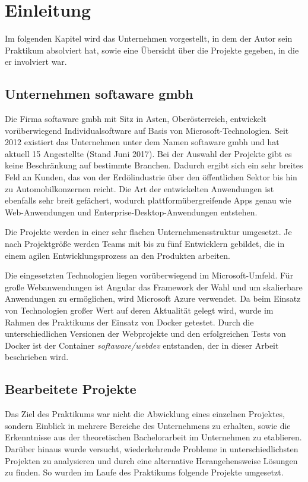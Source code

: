 \chapter{Einleitung}
\label{cha:introduction}

Im folgenden Kapitel wird das Unternehmen vorgestellt, in dem der Autor sein Praktikum absolviert hat, sowie eine Übersicht über die Projekte gegeben, in die er involviert war.

\section{Unternehmen softaware gmbh}
\label{sec:softaware}
Die Firma softaware gmbh mit Sitz in Asten, Oberösterreich, entwickelt vorüberwiegend Individualsoftware auf Basis von Microsoft-Technologien.
Seit 2012 existiert das Unternehmen unter dem Namen softaware gmbh und hat aktuell 15 Angestellte (Stand Juni 2017).
Bei der Auswahl der Projekte gibt es keine Beschränkung auf bestimmte Branchen.
Dadurch ergibt sich ein sehr breites Feld an Kunden, das von der Erdölindustrie über den öffentlichen Sektor bis hin zu Automobilkonzernen reicht.
Die Art der entwickelten Anwendungen ist ebenfalls sehr breit gefächert, wodurch plattformübergreifende Apps genau wie Web-Anwendungen und Enterprise-Desktop-Anwendungen entstehen.

Die Projekte werden in einer sehr flachen Unternehmensstruktur umgesetzt.
Je nach Projektgröße werden Teams mit bis zu fünf Entwicklern gebildet, die in einem agilen Entwicklungsprozess an den Produkten arbeiten.

Die eingesetzten Technologien liegen vorüberwiegend im Microsoft-Umfeld.
Für große Webanwendungen ist Angular das Framework der Wahl und um skalierbare Anwendungen zu ermöglichen, wird Microsoft Azure verwendet.
Da beim Einsatz von Technologien großer Wert auf deren Aktualität gelegt wird, wurde im Rahmen des Praktikums der Einsatz von Docker getestet.
Durch die unterschiedlichen Versionen der Webprojekte und den erfolgreichen Tests von Docker ist der Container \emph{softaware/webdev} entstanden, der in dieser Arbeit beschrieben wird.


\section{Bearbeitete Projekte}
\label{sec:projects}

Das Ziel des Praktikums war nicht die Abwicklung eines einzelnen Projektes, sondern Einblick in mehrere Bereiche des Unternehmens zu erhalten, sowie die Erkenntnisse aus der theoretischen Bachelorarbeit im Unternehmen zu etablieren.
Darüber hinaus wurde versucht, wiederkehrende Probleme in unterschiedlichsten Projekten zu analysieren und durch eine alternative Herangehensweise Lösungen zu finden.
So wurden im Laufe des Praktikums folgende Projekte umgesetzt.

